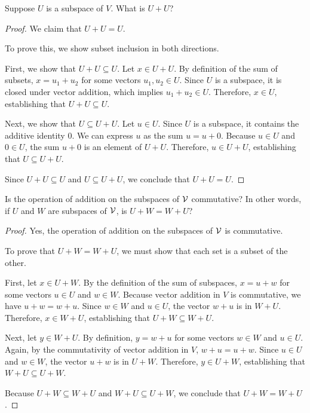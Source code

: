 \begin{question}
	Suppose $U$ is a subspace of $V$. What is $U + U$?
\end{question}
\begin{proof}
	We claim that $U + U = U$.
	
	To prove this, we show subset inclusion in both directions.
	
	First, we show that $U + U \subseteq U$. 
	Let $x \in U + U$. By definition of the sum of subsets, $x = u_1 + u_2$ for some vectors $u_1, u_2 \in U$. 
	Since $U$ is a subspace, it is closed under vector addition, which implies $u_1 + u_2 \in U$. 
	Therefore, $x \in U$, establishing that $U + U \subseteq U$.
	
	Next, we show that $U \subseteq U + U$. 
	Let $u \in U$. Since $U$ is a subspace, it contains the additive identity $0$. 
	We can express $u$ as the sum $u = u + 0$. 
	Because $u \in U$ and $0 \in U$, the sum $u + 0$ is an element of $U + U$. 
	Therefore, $u \in U + U$, establishing that $U \subseteq U + U$.
	
	Since $U + U \subseteq U$ and $U \subseteq U + U$, we conclude that $U + U = U$.
\end{proof}
\begin{question}
	Is the operation of addition on the subspaces of $\mathcal{V}$ commutative? In other words, if $U$ and $W$ are subspaces of $\mathcal{V}$, is $U + W = W + U$?
\end{question}
\begin{proof}
	Yes, the operation of addition on the subspaces of $\mathcal{V}$ is commutative. 
	
	To prove that $U + W = W + U$, we must show that each set is a subset of the other.
	
	First, let $x \in U + W$. By the definition of the sum of subspaces, $x = u + w$ for some vectors $u \in U$ and $w \in W$. 
	Because vector addition in $V$ is commutative, we have $u + w = w + u$. 
	Since $w \in W$ and $u \in U$, the vector $w + u$ is in $W + U$. 
	Therefore, $x \in W + U$, establishing that $U + W \subseteq W + U$.
	
	Next, let $y \in W + U$. By definition, $y = w + u$ for some vectors $w \in W$ and $u \in U$. 
	Again, by the commutativity of vector addition in $V$, $w + u = u + w$. 
	Since $u \in U$ and $w \in W$, the vector $u + w$ is in $U + W$. 
	Therefore, $y \in U + W$, establishing that $W + U \subseteq U + W$.
	
	Because $U + W \subseteq W + U$ and $W + U \subseteq U + W$, we conclude that $U + W = W + U$.
\end{proof}
